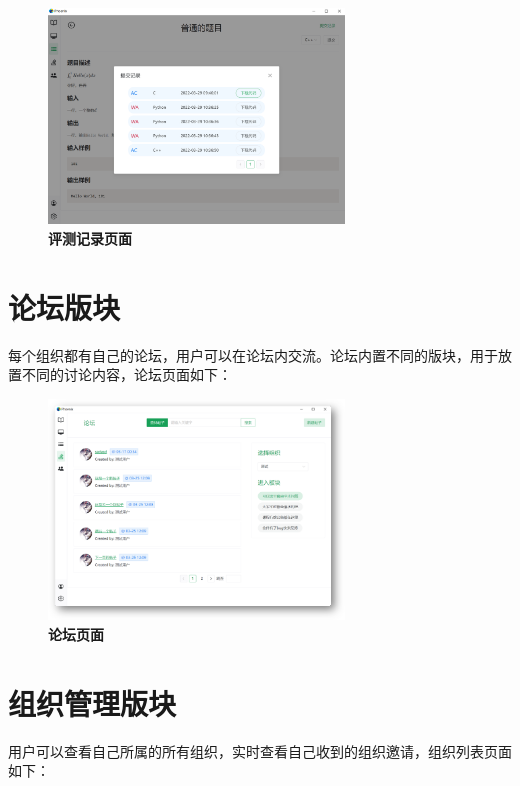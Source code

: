 \begin{figure}[H]
    \centering
    \includegraphics[width=0.7\textwidth]{figure/problem2.png}
    \caption{\textbf{评测记录页面}}
    \label{fig:problem2}
\end{figure}

\section{论坛版块}

每个组织都有自己的论坛，用户可以在论坛内交流。论坛内置不同的版块，用于放置不同的讨论内容，论坛页面如下：

\begin{figure}[H]
    \centering
    \includegraphics[width=0.7\textwidth]{figure/forum1.png}
    \caption{\textbf{论坛页面}}
    \label{fig:forum1}
\end{figure}

\section{组织管理版块}

用户可以查看自己所属的所有组织，实时查看自己收到的组织邀请，组织列表页面如下：

